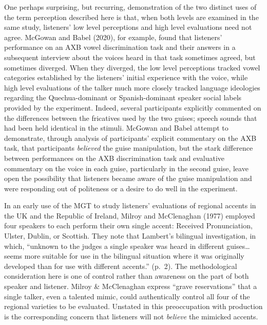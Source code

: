 \documentclass[
  letterpaper,
  DIV=11,
  numbers=noendperiod]{scrartcl}
\begin{document}
One perhaps surprising, but recurring, demonstration of the two distinct
uses of the term perception described here is that, when both levels are
examined in the same study, listeners' low level perceptions and high
level evaluations need not agree. McGowan and Babel (2020), for example,
found that listeners' performance on an AXB vowel discrimination task
and their answers in a subsequent interview about the voices heard in
that task sometimes agreed, but sometimes diverged. When they diverged,
the low level perceptions tracked vowel categories established by the
listeners' initial experience with the voice, while high level
evaluations of the talker much more closely tracked language ideologies
regarding the Quechua-dominant or Spanish-dominant speaker social labels
provided by the experiment. Indeed, several participants explicitly
commented on the differences between the fricatives used by the two
guises; speech sounds that had been held identical in the stimuli.
McGowan and Babel attempt to demonstrate, through analysis of
participants' explicit commentary on the AXB task, that participants
\emph{believed} the guise manipulation, but the stark difference between
performances on the AXB discrimination task and evaluative commentary on
the voice in each guise, particularly in the second guise, leave open
the possibility that listeners became aware of the guise manipulation
and were responding out of politeness or a desire to do well in the
experiment.

In an early use of the MGT to study listeners' evaluations of regional
accents in the UK and the Republic of Ireland, Milroy and McClenaghan
(1977) employed four speakers to each perform their own single accent:
Received Pronunciation, Ulster, Dublin, or Scottish. They note that
Lambert's bilingual investigation, in which, ``unknown to the judges a
single speaker was heard in different guises\ldots{} seems more suitable
for use in the bilingual situation where it was originally developed
than for use with different accents.'' (p.~2). The methodological
consideration here is one of control rather than awareness on the part
of both speaker and listener. Milroy \& McClenaghan express ``grave
reservations'' that a single talker, even a talented mimic, could
authentically control all four of the regional varieties to be
evaluated. Unstated in this preoccupation with production is the
corresponding concern that listeners will not \emph{believe} the
mimicked accents.
\end{document}
